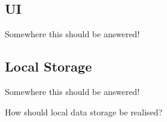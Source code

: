 \subsection{UI}
Somewhere this should be answered!












\subsection{Local Storage}
Somewhere this should be answered!

How should local data storage be realised?

	



